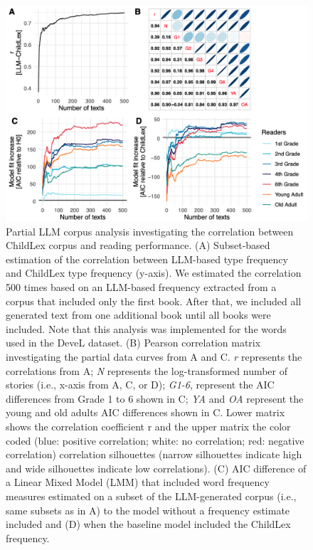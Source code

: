 \documentclass[jou, a4paper]{apa7}
\begin{document}
\begin{figure}[ht]
    \centering
    \includegraphics[scale=.28]{figures/partial_fig.png}
    \caption{Partial LLM corpus analysis investigating the correlation between ChildLex corpus and reading performance. (A) Subset-based estimation of the correlation between LLM-based type frequency and ChildLex type frequency (y-axis). We estimated the correlation 500 times based on an LLM-based frequency extracted from a corpus that included only the first book. After that, we included all generated text from one additional book until all books were included. Note that this analysis was implemented for the words used in the DeveL dataset. (B) Pearson correlation matrix investigating the partial data curves from A and C. \textit{r} represents the correlations from A; \textit{N} represents the log-transformed number of stories (i.e., x-axis from A, C, or D); \textit{G1-6}, represent the AIC differences from Grade 1 to 6 shown in C; \textit{YA} and \textit{OA} represent the young and old adults AIC differences shown in C. Lower matrix shows the correlation coefficient r and the upper matrix the color coded (blue: positive correlation; white: no correlation; red: negative correlation) correlation silhouettes (narrow silhouettes indicate high and wide silhouettes indicate low correlations). (C) AIC difference of a Linear Mixed Model (LMM) that included word frequency measures estimated on a subset of the LLM-generated corpus (i.e., same subsets as in A) to the model without a frequency estimate included and (D) when the baseline model included the ChildLex frequency.}
    \label{fig:partial_data}
\end{figure}
\end{document}
